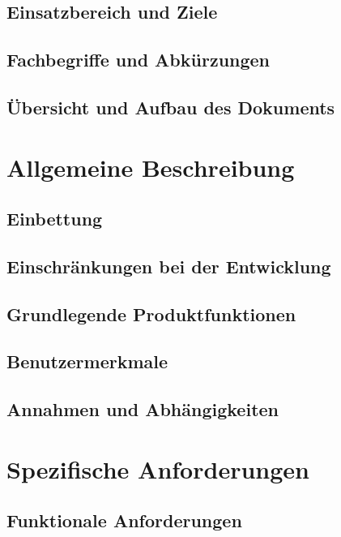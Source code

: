 \documentclass[11pt]{article}
\begin{document}
\subsection{Einsatzbereich und Ziele}

\subsection{Fachbegriffe und Abkürzungen}

\subsection{Übersicht und Aufbau des Dokuments}

\section{Allgemeine Beschreibung}

\subsection{Einbettung}

\subsection{Einschränkungen bei der Entwicklung}

\subsection{Grundlegende Produktfunktionen}

\subsection{Benutzermerkmale}

\subsection{Annahmen und Abhängigkeiten}

\section{Spezifische Anforderungen}

\subsection{Funktionale Anforderungen}
\end{document}
